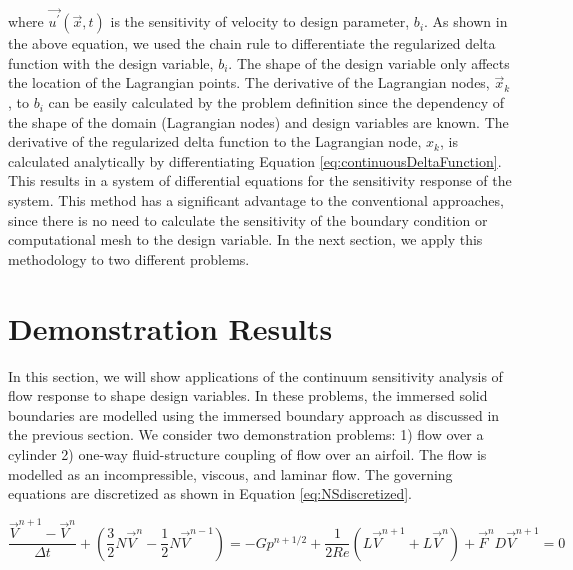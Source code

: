 \documentclass[12pt]{aiaa-pretty}
\begin{document}
where $\vec{u^\prime}\left( \vec{x}, t \right)$ is the sensitivity of velocity to design parameter, $b_i$. As shown in the above equation, we used the chain rule to differentiate the regularized delta function with the design variable, $b_i$. The shape of the design variable only affects the location of the Lagrangian points. The derivative of the Lagrangian nodes, $\vec{x}_k$, to $b_i$ can be easily calculated by the problem definition since the dependency of the shape of the domain (Lagrangian nodes) and design variables are known. The derivative of the regularized delta function to the Lagrangian node, $x_k$, is calculated analytically by differentiating Equation \eqref{eq:continuousDeltaFunction}. This results in a system of differential equations for the sensitivity response of the system. This method has a significant advantage to the conventional approaches, since there is no need to calculate the sensitivity of the boundary condition or computational mesh to the design variable. In the next section, we apply this methodology to two different problems.

\section{Demonstration Results}
In this section, we will show applications of the continuum sensitivity analysis of flow response to shape design variables. In these problems, the immersed solid boundaries are modelled using the immersed boundary approach as discussed in the previous section. We consider two demonstration problems: 1) flow over a cylinder 2) one-way fluid-structure coupling of flow over an airfoil. The flow is modelled as an incompressible, viscous, and laminar flow. The governing equations are discretized as shown in Equation \eqref{eq:NSdiscretized}.

%
\begin{subequations}\label{eq:NSdiscretized}
\begin{equation}
	\frac{\vec{V}^{n+1} - \vec{V}^n}{\Delta t} + 
	\left( \frac{3}{2} N\vec{V}^n - \frac{1}{2} N\vec{V}^{n-1} \right) = 
	-G p^{n + 1/2} + 
	\frac{1}{2Re} \left( L \vec{V}^{n+1} + L \vec{V}^n \right) + 
	\vec{F}^n
\end{equation}
\begin{equation}
	D \vec{V}^{n+1} = 0
\end{equation}
\end{subequations}
%
\end{document}
